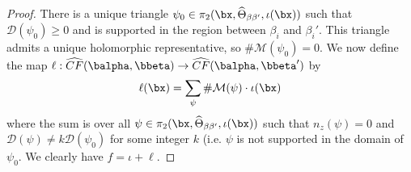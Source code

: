 \begin{proof}
There is a unique triangle $\psi_0 \in \pi_2(\bx,\widehat{\Theta}_{\beta\beta'},\iota(\bx))$ such that $\mathcal D(\psi_0) \geq 0$ and is supported in the region between $\beta_i$ and $\beta_i'$. This triangle admits a unique holomorphic representative, so $\# \mathcal M(\psi_0)=0$. We now define the map $\ell : \widehat{CF}(\balpha,\bbeta) \rightarrow \widehat{CF}(\balpha,\bbeta')$ by
\[ \ell(\bx) = \sum_{\psi} \# \mathcal M(\psi) \cdot \iota(\bx) \]
where the sum is over all $\psi \in \pi_2(\bx,\widehat{\Theta}_{\beta\beta'},\iota(\bx))$ such that $n_z(\psi)=0$ and $\mathcal D(\psi) \neq k \mathcal D(\psi_0)$ for some integer $k$ (i.e. $\psi$ is not supported in the domain of $\psi_0$. We clearly have $f = \iota +\ell$.




\unfinished
\end{proof}


